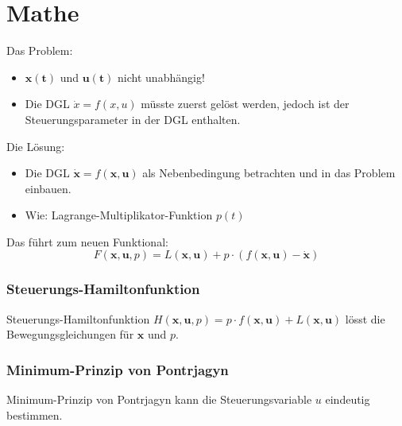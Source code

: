 %
%
%
%
\section{Mathe
\label{leo:section:mathe}}
Das Problem:
\begin{itemize}
	\item $\mathbf{x(t)}$ und $\mathbf{u(t)}$ nicht unabhängig!
	\item Die DGL $\dot{x} = f\left(x,u\right)$ müsste zuerst gelöst werden, jedoch ist der Steuerungsparameter in der DGL enthalten.
\end{itemize}
\vspace{20pt}
Die Lösung:
\begin{itemize}
	\item Die DGL $\mathbf{\dot{x}} = f\left(\mathbf{x},\mathbf{u}\right)$ als Nebenbedingung betrachten und in das Problem einbauen.
	\item Wie: Lagrange-Multiplikator-Funktion $p(t)$
\end{itemize}
\vspace{10pt}
Das führt zum neuen Funktional:
\[F\left(\mathbf{x},\mathbf{u}, p\right) = L\left(\mathbf{x},\mathbf{u}\right) + p \cdot \left(f\left(\mathbf{x},\mathbf{u}\right) - \mathbf{\dot{x}}\right)\]


\subsubsection{Steuerungs-Hamiltonfunktion}
Steuerungs-Hamiltonfunktion \( H(\mathbf{x},\mathbf{u}, p) = p \cdot f(\mathbf{x},\mathbf{u}) + L(\mathbf{x},\mathbf{u}) \) lösst die Bewegungsgleichungen für $\mathbf{x}$ und $p$.


\subsubsection{Minimum-Prinzip von Pontrjagyn}
Minimum-Prinzip von Pontrjagyn kann die Steuerungsvariable $u$ eindeutig bestimmen.


